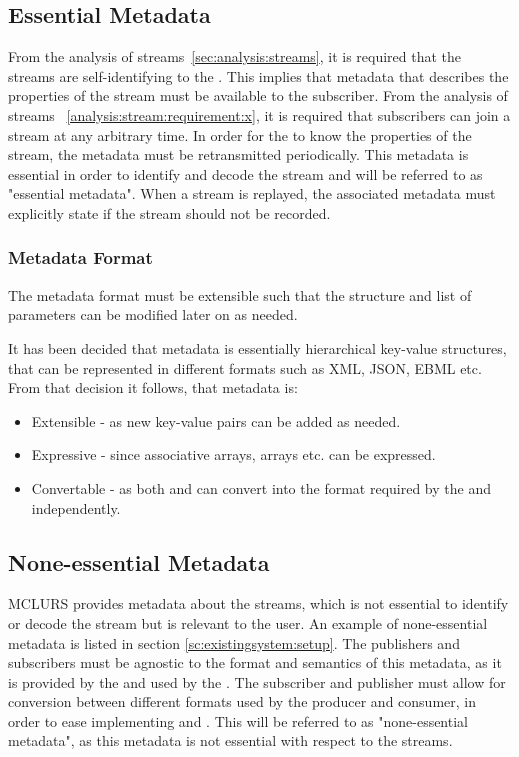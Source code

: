 \subsection{Essential Metadata} \label{sec:analysis:essentialmetadata}
From the analysis of streams~\ref{sec:analysis:streams}, it is required that the streams are self-identifying to the . This implies that metadata that describes the properties of the stream must be available to the subscriber.
From the analysis of streams ~\ref{analysis:stream:requirement:x}, it is required that subscribers can join a stream at any arbitrary time. In order for the  to know the properties of the stream, the metadata must be retransmitted periodically. This metadata is essential in order to identify and decode the stream and will be referred to as "essential metadata". When a stream is replayed, the associated metadata must explicitly state if the stream should not be recorded.

\subsubsection{Metadata Format}
The metadata format must be extensible such that the structure and list of parameters can be modified later on as needed.

It has been decided that metadata is essentially hierarchical key-value structures, that can be represented in different formats such as XML, JSON, EBML etc.  From that decision it follows, that metadata is:
\begin{itemize}
	\item Extensible - as new key-value pairs can be added as needed.
	\item Expressive - since associative arrays, arrays etc. can be expressed.
	\item Convertable - as both  and  can convert into the format required by the  and  independently.
\end{itemize}

\subsection{None-essential Metadata}
\ac{MCLURS} provides metadata about the streams, which is not essential to identify or decode the stream but is relevant to the user. An example of none-essential metadata is listed in section \ref{sc:existingsystem:setup}.
The publishers and subscribers must be agnostic to the format and semantics of this metadata, as it is provided by the  and used by the . The subscriber and publisher must allow for conversion between different formats used by the producer and consumer, in order to ease implementing  and .
This will be referred to as "none-essential metadata", as this metadata is not essential with respect to the streams.\\

